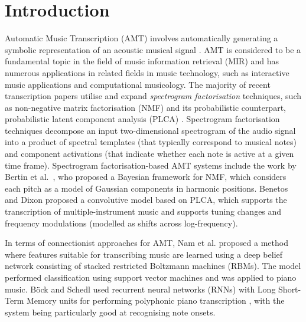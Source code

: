 \section{Introduction} 
\label{sec:introduction}

Automatic Music Transcription (AMT) involves automatically generating a symbolic representation of an acoustic musical signal \cite{Benetos2013b}. AMT is considered to be a fundamental topic in the field of music information retrieval (MIR) and has numerous applications in related fields in music technology, such as interactive music applications and computational musicology. %
The majority of recent transcription papers utilise and expand \emph{spectrogram factorisation} techniques, such as non-negative matrix factorisation (NMF) \cite{Li1999} and its probabilistic counterpart, probabilistic latent component analysis (PLCA) \cite{Smaragdis2006}. Spectrogram factorisation techniques decompose an input two-dimensional spectrogram of the audio signal into a product of spectral templates (that typically correspond to musical notes) and component activations (that indicate whether each note is active at a given time frame). Spectrogram factorisation-based AMT systems include the work by Bertin et al.\ \cite{Bertin2009}, who proposed a Bayesian framework for NMF, which considers each pitch as a model of Gaussian components in harmonic positions. Benetos and Dixon \cite{Benetos2012} proposed a convolutive model based on PLCA, which supports the transcription of multiple-instrument music and supports tuning changes and frequency modulations (modelled as shifts across log-frequency). 

In terms of connectionist approaches for AMT, Nam et al. \cite{Nam2011} proposed a method where features suitable for transcribing music are learned using a deep belief network consisting of stacked restricted Boltzmann machines (RBMs). The model performed classification using support vector machines and was applied to piano music. B\"{o}ck and Schedl used recurrent neural networks (RNNs) with Long Short-Term Memory units for performing polyphonic piano transcription \cite{Bock2012}, with the system being particularly good at recognising note onsets. 

